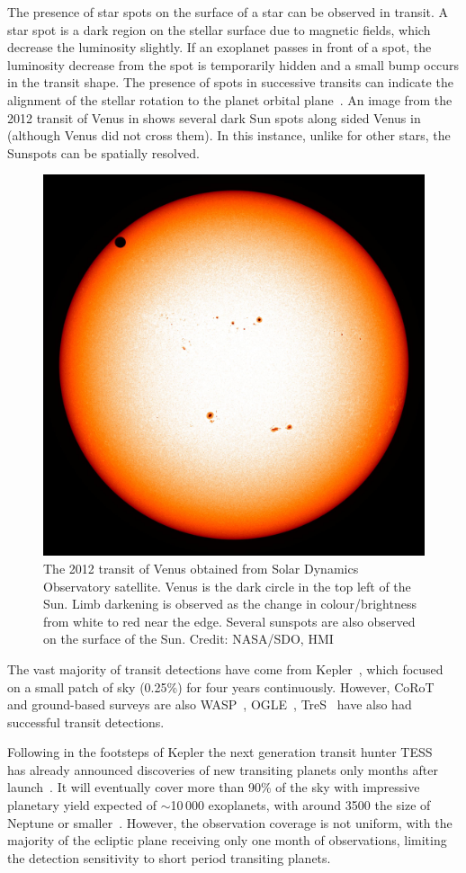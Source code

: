 The presence of star spots on the surface of a star can be observed in transit.
A star spot is a dark region on the stellar surface due to magnetic fields, which decrease the luminosity slightly.
If an exoplanet passes in front of a spot, the luminosity decrease from the spot is temporarily hidden and a small bump occurs in the transit shape.
The presence of spots in successive transits can indicate the alignment of the stellar rotation to the planet orbital plane~\citep{sanchis-ojeda_starspots_2013}.
An image from the 2012 transit of Venus in shows several dark Sun spots along sided Venus in  (although Venus did not cross them).
In this instance, unlike for other stars, the Sunspots can be spatially resolved.

\begin{figure}
    \centering
    \includegraphics[width=0.3\linewidth]{./figures/introduction/SDO_2012_Venus_Transit.jpg}
    \caption{The 2012 transit of Venus obtained from Solar Dynamics Observatory satellite.
        Venus is the dark circle in the top left of the Sun.
        Limb darkening is observed as the change in colour/brightness from white to red near the edge.
        Several sunspots are also observed on the surface of the Sun.
        Credit: NASA/SDO, HMI}
    \label{fig:transit_venus}
\end{figure}


The vast majority of transit detections have come from Kepler~\citep{borucki_characteristics_2011}, which focused on a small patch of sky (0.25\%) for four years continuously.
However, {CoRoT}~\citet{barge_transiting_2008} and ground-based surveys are also WASP~\citep{pollacco_wasp_2006}, OGLE~\citep{udalski_optical_2002}, TreS~\citep{alonso_tres1_2004} have also had successful transit detections.

Following in the footsteps of Kepler the next generation transit hunter {TESS}~\citep{ricker_transiting_2015} has already announced discoveries of new transiting planets only months after launch~\citep{vanderspek_tess_2018, gandolfi_tess_2018, huang_tess_2018}.
It will eventually cover more than 90\% of the sky with impressive planetary yield expected of $\sim$10\,000 exoplanets, with around 3500 the size of Neptune or smaller~\citep{barclay_revised_2018, huang_expected_2018}.
However, the observation coverage is not uniform, with the majority of the ecliptic plane receiving only one month of observations, limiting the detection sensitivity to short period transiting planets.


